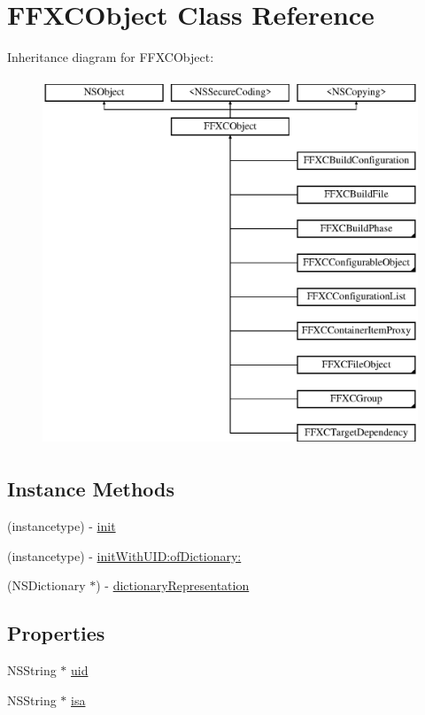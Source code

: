 \hypertarget{interface_f_f_x_c_object}{\section{F\-F\-X\-C\-Object Class Reference}
\label{interface_f_f_x_c_object}
}
Inheritance diagram for F\-F\-X\-C\-Object\-:\begin{figure}[H]
\begin{center}
\leavevmode
\includegraphics[height=11.000000cm]{interface_f_f_x_c_object}
\end{center}
\end{figure}
\subsection*{Instance Methods}
\begin{DoxyCompactItemize}
\item 
(instancetype) -\/ \hyperlink{interface_f_f_x_c_object_a0b0d6e1d6e33fbf4b406f93c62ac4bca}{init}
\item 
(instancetype) -\/ \hyperlink{interface_f_f_x_c_object_a7a1324ead254455e392f19437afe6543}{init\-With\-U\-I\-D\-:of\-Dictionary\-:}
\item 
(N\-S\-Dictionary $\ast$) -\/ \hyperlink{interface_f_f_x_c_object_aee5c7ce67139a69d2e2b0c840f541513}{dictionary\-Representation}
\end{DoxyCompactItemize}
\subsection*{Properties}
\begin{DoxyCompactItemize}
\item 
N\-S\-String $\ast$ \hyperlink{interface_f_f_x_c_object_a7c21028f6fd9d0c869415010be114a11}{uid}
\item 
N\-S\-String $\ast$ \hyperlink{interface_f_f_x_c_object_a8f7fdbf7bce028a3db9e0b578c062394}{isa}
\end{DoxyCompactItemize}



